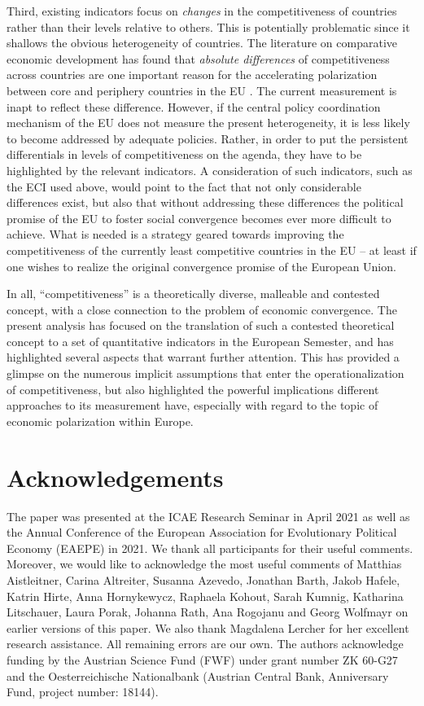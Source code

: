 \documentclass[
]{article}
\begin{document}
Third, existing indicators focus on \emph{changes} in the
competitiveness of countries rather than their levels relative to others. This is potentially
problematic since it shallows the obvious heterogeneity of countries. The
literature on comparative economic development has found that
\emph{absolute differences} of competitiveness across countries are one important reason for the
accelerating polarization between core and periphery countries in the EU
\citep[e.g.][]{Graebner.2020u}. The current measurement is inapt to reflect these difference.
However, if the central policy coordination mechanism of the EU does not
measure the present heterogeneity, it is less likely to become addressed by adequate
policies.
Rather, in order to put the persistent differentials in levels of competitiveness on
the agenda, they have to be highlighted by the relevant indicators.
A consideration of such indicators, such as the ECI used above, would point
to the fact that not only considerable differences exist, but also that
without addressing these differences the political promise of the EU to foster
social convergence becomes ever more difficult to achieve.
What is needed is a strategy geared
towards improving the competitiveness
of the currently least competitive countries in the EU -- at least if one wishes
to realize the original convergence promise of the European Union.

In all, \enquote{competitiveness} is a theoretically diverse, malleable and
contested concept, with a close connection to the problem of economic
convergence.
The present analysis has focused on the translation of such a contested theoretical
concept to a set of quantitative indicators in the European Semester, and has
highlighted several aspects that warrant further attention.
This has provided a glimpse on the numerous implicit assumptions that enter the
operationalization of competitiveness, but also
highlighted the powerful implications different approaches to its measurement have,
especially with regard to the topic of economic polarization within Europe.

\section*{Acknowledgements}
The paper was presented at the ICAE Research Seminar in April 2021 as well as the Annual Conference of the European Association for Evolutionary Political Economy (EAEPE) in 2021. We thank all participants for their useful comments. Moreover, we would like to acknowledge the most useful comments of Matthias Aistleitner, Carina Altreiter, Susanna Azevedo, Jonathan Barth, Jakob Hafele, Katrin Hirte, Anna Hornykewycz, Raphaela Kohout, Sarah Kumnig, Katharina Litschauer, Laura Porak, Johanna Rath, Ana Rogojanu and Georg Wolfmayr on earlier versions of this paper. We also thank Magdalena Lercher for her excellent research assistance. All remaining errors are our own. 
The authors acknowledge funding by the 
Austrian Science Fund (FWF) under grant number ZK 60-G27 and the
Oesterreichische Nationalbank 
(Austrian Central Bank, Anniversary Fund, project number: 18144).
\clearpage

\end{document}
